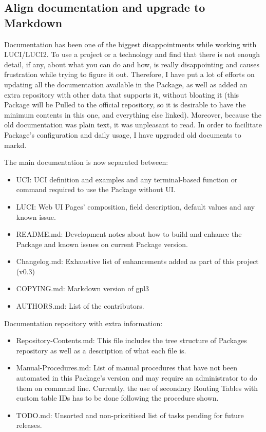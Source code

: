 \subsection{Align documentation and upgrade to Markdown}
Documentation has been one of the biggest disappointments while working with LUCI/LUCI2. To use a project or a technology and find that there is not enough detail, if any, about what you can do and how, is really disappointing and causes frustration while trying to figure it out. Therefore, I have put a lot of efforts on updating all the documentation available in the Package, as well as added an extra repository with other data that supports it, without bloating it (this Package will be Pulled to the official repository, so it is desirable to have the minimum contents in this one, and everything else linked). Moreover, because the old documentation was plain text, it was unpleasant to read. In order to facilitate Package's configuration and daily usage, I have upgraded old documents to \Gls{markd}.

The main documentation is now separated between:
\begin{itemize}
    \item UCI: UCI definition and examples and any terminal-based function or command required to use the Package without UI.
    \item LUCI: Web UI Pages' composition, field description, default values and any known issue.
    \item README.md: Development notes about how to build and enhance the Package and known issues on current Package version.
    \item Changelog.md: Exhaustive list of enhancements added as part of this project (v0.3)
    \item COPYING.md: Markdown version of \acrshort{gpl3}
    \item AUTHORS.md: List of the contributors.
\end{itemize}

Documentation repository with extra information:
\begin{itemize}
    \item Repository-Contents.md: This file includes the tree structure of Packages repository as well as a description of what each file is.
    \item Manual-Procedures.md: List of manual procedures that have not been automated in this Package's version and may require an administrator to do them on command line.
    Currently, the use of secondary Routing Tables with custom table IDs has to be done following the procedure shown.
    \item TODO.md: Unsorted and non-prioritised list of tasks pending for future releases.
\end{itemize}


